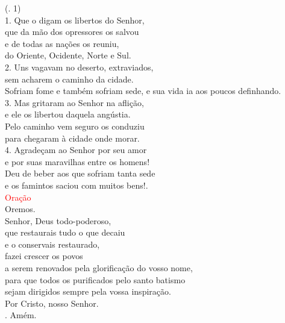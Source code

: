 \documentclass{book}
\begin{document}
\begin{flushleft}
    \hspace{\fill}
    {\color{red} (\Rbar. 1)}
    \vspace{0.1cm} \\
    1. Que o digam os libertos do Senhor, \\
    que da mão dos opressores os salvou \\
    e de todas as nações os reuniu, \\
    do Oriente, Ocidente, Norte e Sul.
    \vspace{0.1cm} \\
    2. Uns vagavam no deserto, extraviados, \\
    sem acharem o caminho da cidade. \\
    Sofriam fome e também sofriam sede,
    e sua vida ia aos poucos definhando.
    \vspace{0.1cm} \\
    3. Mas gritaram ao Senhor na aflição, \\
    e ele os libertou daquela angústia. \\
    Pelo caminho vem seguro os conduziu \\
    para chegaram à cidade onde morar.
    \vspace{0.1cm} \\
    4. Agradeçam ao Senhor por seu amor \\
    e por suas maravilhas entre os homens! \\
    Deu de beber aos que sofriam tanta sede \\
    e os famintos saciou com muitos bens!.
    \vspace{0.2cm} \\
    \textcolor{red}{Oração}
    \vspace{0.1cm} \\
    Oremos.
    \vspace{0.1cm}\\
    Senhor, Deus todo-poderoso, \\
    que restaurais tudo o que decaiu \\
    e o conservais restaurado, \\
    fazei crescer os povos \\
    a serem renovados pela glorificação do vosso nome, \\
    para que todos os purificados pelo santo batismo \\
    sejam dirigidos sempre pela vossa inspiração. \\
    Por Cristo, nosso Senhor. \\
    {\color{red} \Rbar.} Amém.

\end{flushleft}
\end{document}

